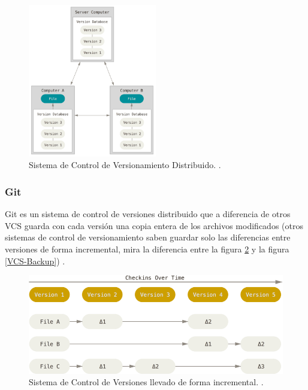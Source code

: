 \begin{figure}
  \begin{center}
      \includegraphics[width=0.5\textwidth]{Figures/dvcs.png}
  \end{center}
  \caption{Sistema de Control de Versionamiento Distribuido. \citep{PROGIT-Git-VCS}.}
  \label{DVCS}
\end{figure}

\subsubsection{Git}
Git es un sistema de control de versiones distribuido que a diferencia de otros VCS guarda con cada versión una copia entera de los archivos modificados (otros sistemas de control de versionamiento saben guardar solo las diferencias entre versiones de forma incremental, mira la diferencia entre la figura \ref{VCS-Incremental} y la figura \ref{VCS-Backup}) \citep{PROGIT-Git-Intro}.

\begin{figure}
  \begin{center}
      \includegraphics[width=\textwidth]{Figures/vcs-incremental.png}
  \end{center}
  \caption{Sistema de Control de Versiones llevado de forma incremental. \citep{PROGIT-Git-Intro}.}
  \label{VCS-Incremental}
\end{figure}


